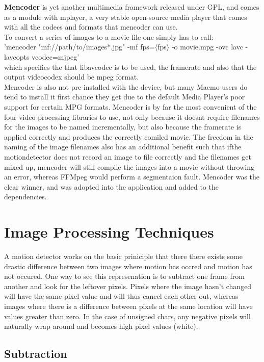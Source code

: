 {{\hspace{-20pt} {\bf Mencoder} is yet another multimedia framework released under GPL, and comes as a module with mplayer, a very stable open-source media player that comes with all the codecs and formats that mencoder can use.\\
To convert a series of images to a movie file one simply has to call:\\
'mencoder "mf://path/to/images*.jpg" -mf fps=\(\langle\)fps\(\rangle\) -o movie.mpg -ovc lavc -lavcopts vcodec=mjpeg'\\
which specifies the that libavcodec is to be used, the framerate and also that the output videocodex should be mpeg format.
\\Mencoder is also not pre-installed with the device, but many Maemo users do tend to install it first chance they get due to the default Media Player's poor support for certain MPG formats. Mencoder is by far the most convenient of the four video processing libraries to use, not only because it doesnt require filenames for the images to be named incrementally, but also because the framerate is applied correctly and produces the correctly comiled movie. The freedom in the naming of the image filenames also has an additional benefit such that ifthe motiondetector does not record an image to file correctly and the filenames get mixed up, mencoder will still compile the images into a movie without throwing an error, whereas FFMpeg would perform a segmentaion fault. Mencoder was the clear winner, and was adopted into the application and added to the dependencies.


\section{Image Processing Techniques}\label{proctechniques}
A motion detector works on the basic priniciple that there there exists some drastic difference between two images where motion has occred and motion has not occured. One way to see this represenation is to subtract one frame from another and look for the leftover pixels. Pixels where the image hasn't changed will have the same pixel value and will thus cancel each other out, whereas images where there is a difference between pixels at the same location will have values greater than zero. In the case of unsigned chars, any negative pixels will naturally wrap around and becomes high pixel values (white).
\pagebreak
\subsection{Subtraction}
}}
